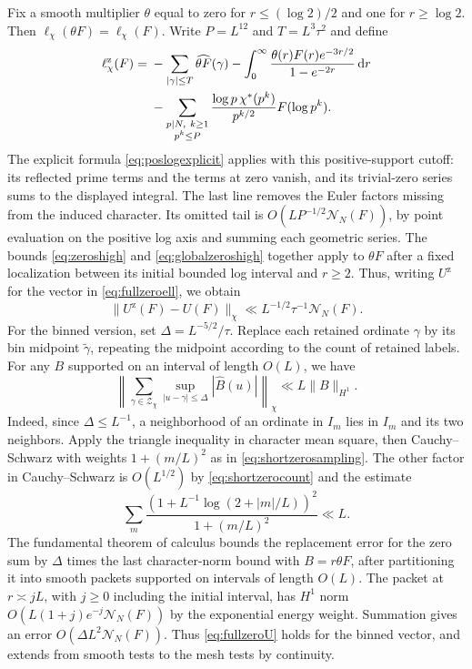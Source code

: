 \documentclass[11pt,a4paper]{article}
\numberwithin{equation}{section}
\newcommand{\ud}{\mathrm d}
\newcommand{\NN}{\mathcal N_N}
\begin{document}
Fix a smooth multiplier $\theta$ equal to zero for
$r\le(\log 2)/2$ and one for $r\ge\log 2$. Then
$\ell_\chi(\theta F)=\ell_\chi(F)$. Write
$P=L^{12}$ and $T=L^3\tau^2$ and define
\begin{align}
 \ell_{\chi}^{\mathrm z}(F)
  ={}&-\sum_{|\gamma|\le T}\widehat{\theta F}(\gamma)
       -\int_0^\infty \frac{\theta(r)F(r)e^{-3r/2}}{1-e^{-2r}}
                    \,\ud r \notag\\
     &-\sum_{\substack{p\mid N,\ k\ge1\\p^k\le P}}
       \frac{\log p\,\chi^*(p^k)}{p^{k/2}} F(\log p^k).
 \label{eq:fullzeroell}
\end{align}
The explicit formula \eqref{eq:poslogexplicit} applies
with this positive-support cutoff: its reflected prime
terms and the terms at zero vanish, and its trivial-zero
series sums to the displayed integral. The last line
removes the Euler factors missing from the induced
character. Its omitted tail is $O(LP^{-1/2}\NN(F))$,
by point evaluation on the positive log axis and summing
each geometric series. The bounds
\eqref{eq:zeroshigh} and \eqref{eq:globalzeroshigh} together
apply to $\theta F$ after a fixed localization between
its initial bounded log interval and $r\ge2$. Thus,
writing $U^{\mathrm z}$ for the vector in
\cref{eq:fullzeroell}, we obtain
\begin{equation}
 \|U^{\mathrm z}(F)-U(F)\|_\chi
       \ll L^{-1/2}\tau^{-1}\NN(F).
 \label{eq:fullzeroU}
\end{equation}
For the binned version, set $\Delta=L^{-5/2}/\tau$. Replace
each retained ordinate $\gamma$ by its bin midpoint
$\widetilde\gamma$, repeating the midpoint according to
the count of retained labels. For any $B$ supported on an
interval of length $O(L)$, we have
\[
 \left\|\sum_{\gamma\in\mathcal Z_\chi}
             \sup_{|u-\gamma|\le\Delta}|\widehat B(u)|\right\|_\chi
 \ll L\|B\|_{H^1}.
\]
Indeed, since $\Delta\le L^{-1}$, a neighborhood of an
ordinate in $I_m$ lies in $I_m$ and its two neighbors.
Apply the triangle inequality in character mean square,
then Cauchy--Schwarz with weights $1+(m/L)^2$ as in
\cref{eq:shortzerosampling}. The other factor in Cauchy--Schwarz
is $O(L^{1/2})$ by \cref{eq:shortzerocount} and the estimate
\[
 \sum_m \frac{(1+L^{-1}\log(2+|m|/L))^2}{1+(m/L)^2}\ll L.
\]
The fundamental theorem of calculus bounds the replacement
error for the zero sum by $\Delta$ times the last
character-norm bound with $B=r\theta F$, after partitioning
it into smooth packets supported on intervals of length
$O(L)$. The packet at $r\asymp jL$, with $j\ge0$
including the initial interval, has $H^1$ norm
$O(L(1+j)e^{-j}\NN(F))$ by the exponential energy weight.
Summation gives an error $O(\Delta L^2\NN(F))$.
Thus \cref{eq:fullzeroU} holds for the binned vector, and
extends from smooth tests to the mesh tests by continuity.
\end{document}
